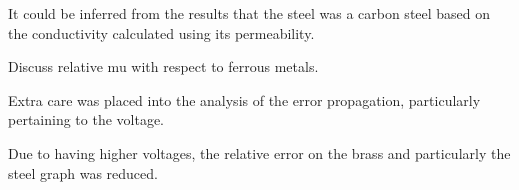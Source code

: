 \documentclass[a4paper,12pt,twocolumn]{article}
\begin{document}
	\begin{table}[]
		\centering
		\captionsetup{font=scriptsize}
		\caption{The calculated conductivity for each metal cylinder. The uncertainties shown were calculated using error propagation. See appendix [PYTHON ERROR]}
		\label{tab:conductivity}
	\end{table}
	
	It could be inferred from the results that the steel was a carbon steel based on the conductivity calculated using its permeability.
	
	Discuss relative mu with respect to ferrous metals.
	
	Extra care was placed into the analysis of the error propagation, particularly pertaining to the voltage.
	
	Due to having higher voltages, the relative error on the brass and particularly the steel graph was reduced.
	
\end{document}
